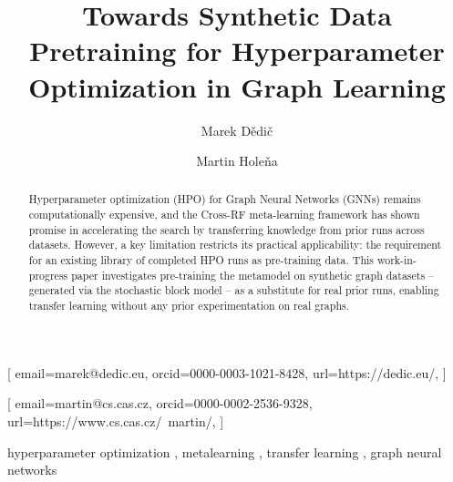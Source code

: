 

\title{Towards Synthetic Data Pretraining for Hyperparameter Optimization in Graph Learning}

\author[1]{Marek Dědič}[%
	email=marek@dedic.eu,
	orcid=0000-0003-1021-8428,
	url=https://dedic.eu/,
]
\cormark[1]
\address[1]{Czech Technical University in Prague, Trojanova 13, Prague, Czech Republic}

\author[2]{Martin Holeňa}[%
	email=martin@cs.cas.cz,
	orcid=0000-0002-2536-9328,
	url=https://www.cs.cas.cz/~martin/,
]
\address[2]{Czech Academy of Sciences, Pod Vodárenskou věží 271/2, Prague, Czech Republic}


\begin{abstract}
	Hyperparameter optimization (HPO) for Graph Neural Networks (GNNs) remains computationally expensive, and the Cross-RF meta-learning framework has shown promise in accelerating the search by transferring knowledge from prior runs across datasets. However, a key limitation restricts its practical applicability: the requirement for an existing library of completed HPO runs as pre-training data. This work-in-progress paper investigates pre-training the metamodel on synthetic graph datasets -- generated via the stochastic block model -- as a substitute for real prior runs, enabling transfer learning without any prior experimentation on real graphs.
\end{abstract}

\begin{keywords}
	hyperparameter optimization \sep
	metalearning \sep
	transfer learning \sep
	graph neural networks
\end{keywords}

\maketitle
